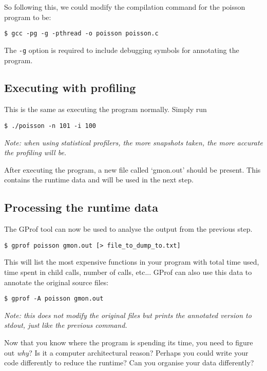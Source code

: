 \documentclass[a4paper,11pt]{article}
\begin{document}
So following this, we could modify the compilation command for the poisson
program to be:
%
\begin{verbatim}
$ gcc -pg -g -pthread -o poisson poisson.c
\end{verbatim}
%
The \texttt{-g} option is required to include debugging symbols for annotating the program.


\subsection{Executing with profiling}

This is the same as executing the program normally. Simply run
\begin{verbatim}
$ ./poisson -n 101 -i 100
\end{verbatim}

\emph{Note: when using statistical profilers, the more snapshots taken, the more
accurate the profiling will be.}

After executing the program, a new file called `gmon.out' should be present.
This contains the runtime data and will be used in the next step.

\subsection{Processing the runtime data}

The GProf tool can now be used to analyse the output from the previous step.

\begin{verbatim}
$ gprof poisson gmon.out [> file_to_dump_to.txt]
\end{verbatim}

This will list the most expensive functions in your program with total time
used, time spent in child calls, number of calls, etc... GProf can also use this
data to annotate the original source files:

\begin{verbatim}
$ gprof -A poisson gmon.out
\end{verbatim}

\emph{Note: this does not modify the original files but prints the annotated
version to stdout, just like the previous command.}

Now that you know where the program is spending its time, you need to figure out
\emph{why}? Is it a computer architectural reason? Perhaps you could write your
code differently to reduce the runtime? Can you organise your data differently?
\end{document}
